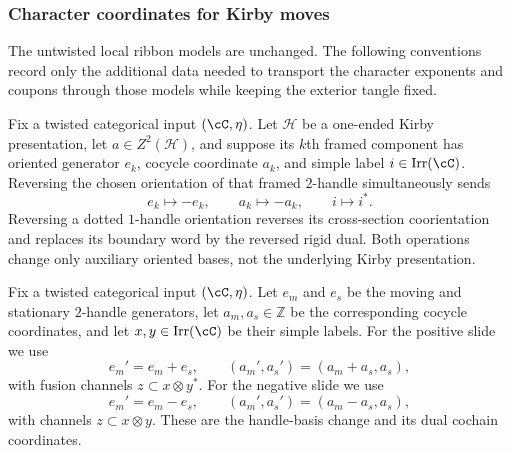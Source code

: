 \subsubsection{Character coordinates for Kirby moves}
\label{subsec:local-kirby-models}

The untwisted local ribbon models are unchanged.  The following conventions
record only the additional data needed to transport the character exponents
and coupons through those models while keeping the exterior tangle fixed.

\begin{convention}
\label{conv:orientation-reversal}
Fix a twisted categorical input \((\cC,\eta)\).  Let \(\mathcal H\) be a
one-ended Kirby presentation, let
\(a\in Z^2(\mathcal H)\), and suppose its \(k\)th framed component has
oriented generator \(e_k\), cocycle coordinate \(a_k\), and simple label
\(i\in\operatorname{Irr}(\cC)\).  Reversing the chosen orientation of that
framed \(2\)-handle
simultaneously sends
\[
  e_k\longmapsto-e_k,
  \qquad a_k\longmapsto-a_k,
  \qquad i\longmapsto i^*.
\]
Reversing a dotted \(1\)-handle orientation reverses its cross-section
coorientation and replaces its boundary word by the reversed rigid dual.  Both
operations change only auxiliary oriented bases, not the underlying Kirby
presentation.
\end{convention}

\begin{convention}
\label{conv:two-two-coordinates}
Fix a twisted categorical input \((\cC,\eta)\).
Let \(e_m\) and \(e_s\) be the moving and stationary \(2\)-handle generators,
let \(a_m,a_s\in\mathbb Z\) be the corresponding cocycle coordinates, and
let \(x,y\in\operatorname{Irr}(\cC)\) be their simple labels.  For the positive
slide we use
\[
  e_m'=e_m+e_s,
  \qquad (a_m',a_s')=(a_m+a_s,a_s),
\]
with fusion channels \(z\subset x\otimes y^*\).  For the negative slide we
use
\[
  e_m'=e_m-e_s,
  \qquad (a_m',a_s')=(a_m-a_s,a_s),
\]
with channels \(z\subset x\otimes y\).  These are the handle-basis change and
its dual cochain coordinates.
\end{convention}
